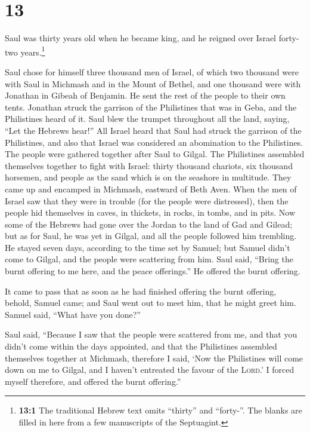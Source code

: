 \hypertarget{section-12}{%
\section{13}\label{section-12}}

 Saul was thirty years old when he became king, and he
reigned over Israel forty-two years.\footnote{\textbf{13:1} The
  traditional Hebrew text omits ``thirty'' and ``forty-''. The blanks
  are filled in here from a few manuscripts of the Septuagint.}

 Saul chose for himself three thousand men of Israel, of
which two thousand were with Saul in Michmash and in the Mount of
Bethel, and one thousand were with Jonathan in Gibeah of Benjamin. He
sent the rest of the people to their own tents.  Jonathan
struck the garrison of the Philistines that was in Geba, and the
Philistines heard of it. Saul blew the trumpet throughout all the land,
saying, ``Let the Hebrews hear!''  All Israel heard that
Saul had struck the garrison of the Philistines, and also that Israel
was considered an abomination to the Philistines. The people were
gathered together after Saul to Gilgal.  The Philistines
assembled themselves together to fight with Israel: thirty thousand
chariots, six thousand horsemen, and people as the sand which is on the
seashore in multitude. They came up and encamped in Michmash, eastward
of Beth Aven.  When the men of Israel saw that they were
in trouble (for the people were distressed), then the people hid
themselves in caves, in thickets, in rocks, in tombs, and in pits.
 Now some of the Hebrews had gone over the Jordan to the
land of Gad and Gilead; but as for Saul, he was yet in Gilgal, and all
the people followed him trembling.  He stayed seven days,
according to the time set by Samuel; but Samuel didn't come to Gilgal,
and the people were scattering from him.  Saul said,
``Bring the burnt offering to me here, and the peace offerings.'' He
offered the burnt offering.

 It came to pass that as soon as he had finished offering
the burnt offering, behold, Samuel came; and Saul went out to meet him,
that he might greet him.  Samuel said, ``What have you
done?''

Saul said, ``Because I saw that the people were scattered from me, and
that you didn't come within the days appointed, and that the Philistines
assembled themselves together at Michmash,  therefore I
said, `Now the Philistines will come down on me to Gilgal, and I haven't
entreated the favour of the \textsc{Lord}.' I forced myself therefore,
and offered the burnt offering.''

